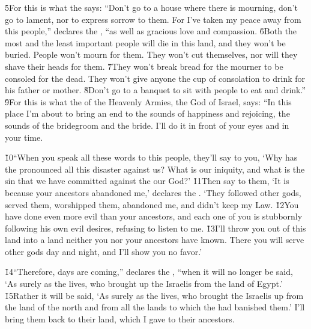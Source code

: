 \v{5}For this is what the  says: ``Don't go to a house where there is mourning, don't go to lament, nor to express sorrow to them. For I've taken my peace away from this people,'' declares the , ``as well as gracious love and compassion. \v{6}Both the most and the least important people will die in this land, and they won't be buried. People won't mourn for them. They won't cut themselves, nor will they shave their heads for them. \v{7}They won't break bread for the mourner to be consoled for the dead. They won't give anyone the cup of consolation to drink for his father or mother. \v{8}Don't go to a banquet to sit with people to eat and drink.'' \v{9}For this is what the  of the Heavenly Armies, the God of Israel, says: ``In this place I'm about to bring an end to the sounds of happiness and rejoicing, the sounds of the bridegroom and the bride. I'll do it in front of your eyes and in your time.

\v{10}``When you speak all these words to this people, they'll say to you, `Why has the  pronounced all this disaster against us? What is our iniquity, and what is the sin that we have committed against the  our God?' \v{11}Then say to them, `It is because your ancestors abandoned me,' declares the . `They followed other gods, served them, worshipped them, abandoned me, and didn't keep my Law. \v{12}You have done even more evil than your ancestors, and each one of you is stubbornly following his own evil desires, refusing to listen to me. \v{13}I'll throw you out of this land into a land neither you nor your ancestors have known. There you will serve other gods day and night, and I'll show you no favor.'

\v{14}``Therefore, days are coming,'' declares the , ``when it will no longer be said, `As surely as the  lives, who brought up the Israelis from the land of Egypt.' \v{15}Rather it will be said, `As surely as the  lives, who brought the Israelis up from the land of the north and from all the lands to which the  had banished them.' I'll bring them back to their land, which I gave to their ancestors.

